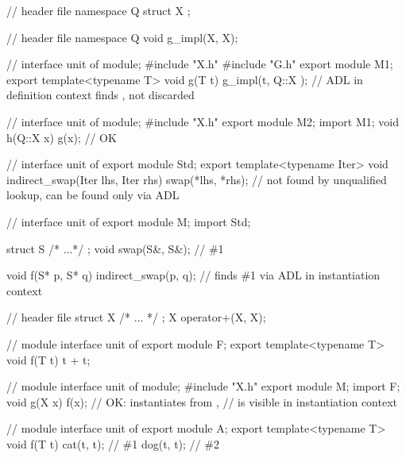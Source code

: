 \begin{std.txt}\color{addclr}
\pnum[2]
\enterexample
\begin{codeblock}
// header file 
namespace Q { 
  struct X { };
}

// header file 
namespace Q {
  void g_impl(X, X);
}

// interface unit of 
module;
#include "X.h"
#include "G.h"
export module M1;
export template<typename T>
void g(T t) {
  g_impl(t, Q::X{ });   // ADL in definition context finds ,  not discarded
}

// interface unit of 
module;
#include "X.h"
export module M2;
import M1;
void h(Q::X x) {
   g(x);                // OK
}
\end{codeblock}
\exitexample

\color{addclr}
\pnum
\enterexample
\begin{codeblock}
// interface unit of 
export module Std;
export template<typename Iter>
void indirect_swap(Iter lhs, Iter rhs)
{
  swap(*lhs, *rhs);     //  not found by unqualified lookup, can be found only via ADL
}

// interface unit of 
export module M;
import Std;

struct S { /* ...*/ };
void swap(S&, S&);      // \#1

void f(S* p, S* q)
{
  indirect_swap(p, q);  // finds \#1 via ADL in instantiation context
}
\end{codeblock}
\exitexample

\pnum
\enterexample
\begin{codeblock}
// header file 
struct X { /* ... */ };
X operator+(X, X);

// module interface unit of 
export module F;
export template<typename T>
void f(T t) {
  t + t;
}

// module interface unit of 
module;
#include "X.h"
export module M;
import F;
void g(X x) {
  f(x);             // OK: instantiates  from ,
                    //  is visible in instantiation context
}
\end{codeblock}
\exitexample

\pnum
\enterexample
\begin{codeblock}
// module interface unit of 
export module A;
export template<typename T>
void f(T t) {
  cat(t, t);         // \#1
  dog(t, t);         // \#2
}


\end{codeblock}
\end{std.txt}
